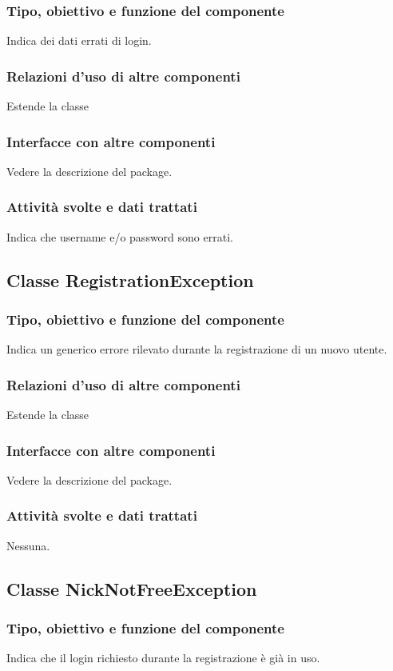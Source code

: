 \subsubsection*{Tipo, obiettivo e funzione del componente}
Indica dei dati errati di login.
\subsubsection*{Relazioni d'uso di altre componenti}
Estende la classe 
\subsubsection*{Interfacce con altre componenti}
Vedere la descrizione del package.
\subsubsection*{Attivit\`a svolte e dati trattati}
Indica che username e/o password sono errati.

\subsection{Classe RegistrationException}
\subsubsection*{Tipo, obiettivo e funzione del componente}
Indica un generico errore rilevato durante la registrazione di un nuovo utente.
\subsubsection*{Relazioni d'uso di altre componenti}
Estende la classe 
\subsubsection*{Interfacce con altre componenti}
Vedere la descrizione del package.
\subsubsection*{Attivit\`a svolte e dati trattati}
Nessuna.

\subsection{Classe NickNotFreeException}
\subsubsection*{Tipo, obiettivo e funzione del componente}
Indica che il login richiesto durante la registrazione \`e gi\`a in uso.
